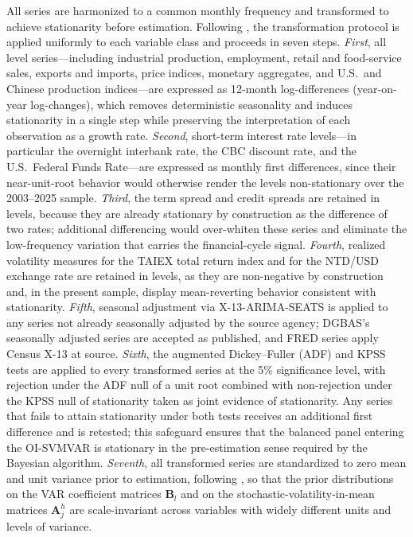 \indent All series are harmonized to a common monthly frequency and transformed to achieve stationarity before estimation. Following \citet{davidson2025investigating}, the transformation protocol is applied uniformly to each variable class and proceeds in seven steps. \textit{First}, all level series---including industrial production, employment, retail and food-service sales, exports and imports, price indices, monetary aggregates, and U.S.\ and Chinese production indices---are expressed as 12-month log-differences (year-on-year log-changes), which removes deterministic seasonality and induces stationarity in a single step while preserving the interpretation of each observation as a growth rate. \textit{Second}, short-term interest rate levels---in particular the overnight interbank rate, the CBC discount rate, and the U.S.\ Federal Funds Rate---are expressed as monthly first differences, since their near-unit-root behavior would otherwise render the levels non-stationary over the 2003--2025 sample. \textit{Third}, the term spread and credit spreads are retained in levels, because they are already stationary by construction as the difference of two rates; additional differencing would over-whiten these series and eliminate the low-frequency variation that carries the financial-cycle signal. \textit{Fourth}, realized volatility measures for the TAIEX total return index and for the NTD/USD exchange rate are retained in levels, as they are non-negative by construction and, in the present sample, display mean-reverting behavior consistent with stationarity. \textit{Fifth}, seasonal adjustment via X-13-ARIMA-SEATS is applied to any series not already seasonally adjusted by the source agency; DGBAS's seasonally adjusted series are accepted as published, and FRED series apply Census X-13 at source. \textit{Sixth}, the augmented Dickey--Fuller (ADF) and KPSS tests are applied to every transformed series at the 5\% significance level, with rejection under the ADF null of a unit root combined with non-rejection under the KPSS null of stationarity taken as joint evidence of stationarity. Any series that fails to attain stationarity under both tests receives an additional first difference and is retested; this safeguard ensures that the balanced panel entering the OI-SVMVAR is stationary in the pre-estimation sense required by the Bayesian algorithm. \textit{Seventh}, all transformed series are standardized to zero mean and unit variance prior to estimation, following \citet{davidson2025investigating}, so that the prior distributions on the VAR coefficient matrices $\mathbf{B}_l$ and on the stochastic-volatility-in-mean matrices $\mathbf{A}_j^{h}$ are scale-invariant across variables with widely different units and levels of variance.

